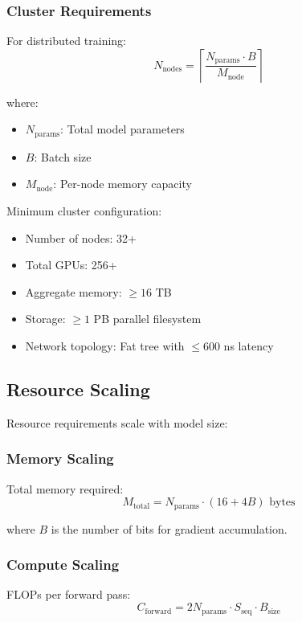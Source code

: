 \documentclass{article}
\begin{document}
\subsubsection{Cluster Requirements}
For distributed training:
\begin{equation}
N_{\text{nodes}} = \left\lceil\frac{N_{\text{params}} \cdot B}{M_{\text{node}}}\right\rceil
\end{equation}

where:
\begin{itemize}
\item $N_{\text{params}}$: Total model parameters
\item $B$: Batch size
\item $M_{\text{node}}$: Per-node memory capacity
\end{itemize}

Minimum cluster configuration:
\begin{itemize}
\item Number of nodes: 32+
\item Total GPUs: 256+
\item Aggregate memory: $\geq 16$ TB
\item Storage: $\geq 1$ PB parallel filesystem
\item Network topology: Fat tree with $\leq 600$ ns latency
\end{itemize}

\subsection{Resource Scaling}
Resource requirements scale with model size:

\subsubsection{Memory Scaling}
Total memory required:
\begin{equation}
M_{\text{total}} = N_{\text{params}} \cdot (16 + 4B) \text{ bytes}
\end{equation}

where $B$ is the number of bits for gradient accumulation.

\subsubsection{Compute Scaling}
FLOPs per forward pass:
\begin{equation}
C_{\text{forward}} = 2N_{\text{params}} \cdot S_{\text{seq}} \cdot B_{\text{size}}
\end{equation}
\end{document}

